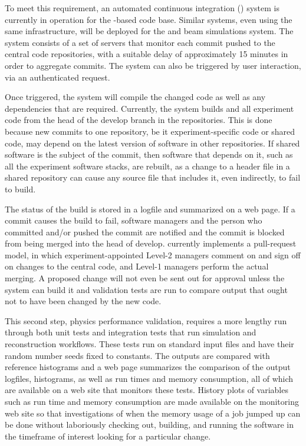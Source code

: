 \documentclass[../main-v1.tex]{subfiles}
\begin{document}
To meet this requirement, an automated continuous integration () system is currently in operation for the -based code base.  Similar systems, even using the same infrastructure, will be deployed for the  and beam simulations system.  The  system consists of a set of servers that monitor %
each commit pushed to the central code repositories, with a suitable delay of approximately 15 minutes in order to aggregate commits. The  system can also be triggered by user interaction, via an authenticated request.

Once triggered, the  system will compile the changed code as well as any dependencies that are required.  Currently, the  system builds  and all experiment code from the head of the develop branch in the repositories.  This is done because new commits to one repository, be it experiment-specific code or shared  code, may depend on the latest version of software in other repositories.  If shared software is the subject of the commit, then software that depends on it, such as all the experiment software stacks, are rebuilt, as a change to a header file in a shared repository can cause any source file that includes it, even indirectly, to fail to build.

The status of the build is stored in a logfile and summarized on a web page.  If a commit causes the build to fail, software managers and the person who committed and/or pushed the commit are notified and the commit is blocked from being merged into the head of develop.   currently implements a pull-request model, in which experiment-appointed Level-2 managers comment on and sign off on changes to the central code, and Level-1 managers perform the actual merging.  A proposed change will not even be sent out for approval unless the  system can build it and validation tests are run to compare output that ought not to have been changed by the new code.

This second step, physics performance validation, requires a more lengthy run through both unit tests and integration tests that run simulation and reconstruction workflows.  These tests run on standard input files and have their random number seeds fixed to constants.  The outputs are compared with reference histograms and a web page summarizes the comparison of the output logfiles, histograms, as well as run times and memory consumption, all of which are available on a web site that monitors these tests.  History plots of variables such as run time and memory consumption are made available on the monitoring web site so that investigations of when the memory usage of a job jumped up can be done without laboriously checking out, building, and running the software in the %
timeframe of interest looking for a particular change.
\end{document}
